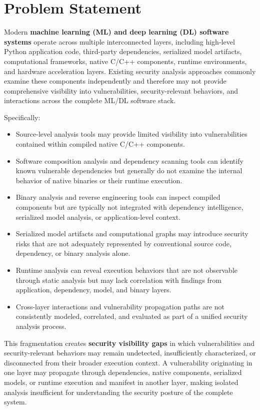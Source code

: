 \documentclass[
  12pt,
  letterpaper,
  oneside]{report}
\providecommand{\tightlist}{%
  \setlength{\itemsep}{0pt}\setlength{\parskip}{0pt}}
\begin{document}
\chapter{Problem Statement}\label{2-problem-statement}

Modern \textbf{machine learning (ML) and deep learning (DL) software
systems} operate across multiple interconnected layers, including
high-level Python application code, third-party dependencies, serialized
model artifacts, computational frameworks, native C/C++ components,
runtime environments, and hardware acceleration layers. Existing
security analysis approaches commonly examine these components
independently and therefore may not provide comprehensive visibility
into vulnerabilities, security-relevant behaviors, and interactions
across the complete ML/DL software stack.

Specifically:

\begin{itemize}
\tightlist
\item
  Source-level analysis tools may provide limited visibility into
  vulnerabilities contained within compiled native C/C++ components.
\item
  Software composition analysis and dependency scanning tools can
  identify known vulnerable dependencies but generally do not examine
  the internal behavior of native binaries or their runtime execution.
\item
  Binary analysis and reverse engineering tools can inspect compiled
  components but are typically not integrated with dependency
  intelligence, serialized model analysis, or application-level context.
\item
  Serialized model artifacts and computational graphs may introduce
  security risks that are not adequately represented by conventional
  source code, dependency, or binary analysis alone.
\item
  Runtime analysis can reveal execution behaviors that are not
  observable through static analysis but may lack correlation with
  findings from application, dependency, model, and binary layers.
\item
  Cross-layer interactions and vulnerability propagation paths are not
  consistently modeled, correlated, and evaluated as part of a unified
  security analysis process.
\end{itemize}

This fragmentation creates \textbf{security visibility gaps} in which
vulnerabilities and security-relevant behaviors may remain undetected,
insufficiently characterized, or disconnected from their broader
execution context. A vulnerability originating in one layer may
propagate through dependencies, native components, serialized models, or
runtime execution and manifest in another layer, making isolated
analysis insufficient for understanding the security posture of the
complete system.
\end{document}
